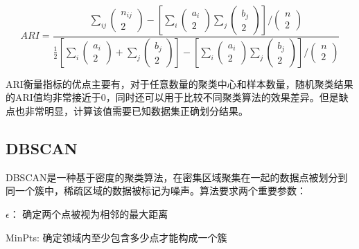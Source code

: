 \begin{equation}
	ARI = \frac{\sum_{i j}\left(\begin{array}{c}
				n_{i j} \\
				2
			\end{array}\right)-\left[\sum_i\left(\begin{array}{c}
				a_i \\
				2
			\end{array}\right) \sum_j\left(\begin{array}{c}
				b_j \\
				2
			\end{array}\right)\right] /\left(\begin{array}{c}
				n \\
				2
			\end{array}\right)}{\frac{1}{2}\left[\sum_i\left(\begin{array}{c}
				a_i \\
				2
			\end{array}\right)+\sum_j\left(\begin{array}{c}
				b_j \\
				2
			\end{array}\right)\right]-\left[\sum_i\left(\begin{array}{c}
				a_i \\
				2
			\end{array}\right) \sum_j\left(\begin{array}{c}
				b_j \\
				2
			\end{array}\right)\right] /\left(\begin{array}{c}
				n \\
				2
			\end{array}\right)}
	\label{equ_ari}
\end{equation}

ARI衡量指标的优点主要有，对于任意数量的聚类中心和样本数量，随机聚类结果的ARI值均非常接近于0，同时还可以用于比较不同聚类算法的效果差异。但是缺点也非常明显，计算该值需要已知数据集正确划分结果。


\subsection{DBSCAN}
DBSCAN是一种基于密度的聚类算法，在密集区域聚集在一起的数据点被划分到同一个簇中，稀疏区域的数据被标记为噪声\cite{khan2014dbscan}。算法要求两个重要参数：
\begin{compactitem}
	\item $\epsilon$： 确定两个点被视为相邻的最大距离
	\item MinPts: 确定领域内至少包含多少点才能构成一个簇
\end{compactitem}

